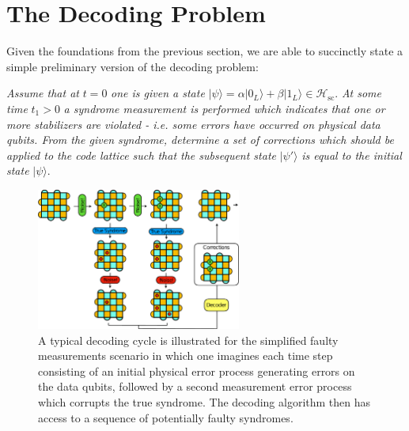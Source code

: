 \documentclass[twocolumn,preprintnumbers,amsmath,amssymb,notitlepage,nofootinbib,longbibliography,superscriptaddress,aps,pra,10pt]{revtex4-1}
\begin{document}
\section{The Decoding Problem}\label{s:the_decoding_problem}

	Given the foundations from the previous section, we are able to succinctly state a simple preliminary version of the decoding problem: \newline

	\noindent\textit{Assume that at} $t=0$  \textit{one is given a state} $|\psi\rangle = \alpha |0_L\rangle + \beta |1_L\rangle \in \mathcal{H}_{\mathrm{sc}}.$ \textit{At some time }$t_1>0$ \textit{a syndrome measurement is performed which indicates that one or more stabilizers are violated - i.e. some errors have occurred on physical data qubits. From the given syndrome, determine a set of corrections which should be applied to the code lattice such that the subsequent state} $|\psi'\rangle$ \textit{is equal to the initial state} $|\psi\rangle.$ \newline

	\begin{figure}
		\centering
		\includegraphics[width=0.6\textwidth]{figures/decoding_problem.pdf}
		\caption{
			A typical decoding cycle is illustrated for the simplified faulty measurements scenario in which one imagines each time step consisting of an initial physical error process generating errors on the data qubits, followed by a second measurement error process which corrupts the true syndrome.
			The decoding algorithm then has access to a sequence of potentially faulty syndromes.
		}
		\label{f:decoding_problem}
	\end{figure}
\end{document}
